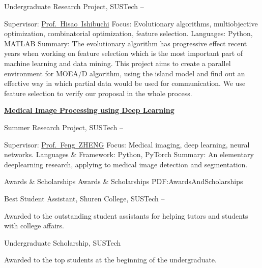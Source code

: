\documentclass[a4paper,MMMyyyy,nonstopmode]{simpleresumecv}
\begin{document}
\begin{Body}
\BulletItem
Undergraduate Research Project, SUSTech
\hfill
{} --
\begin{Detail}
\SubBulletItem
Supervisor:
\href{http://cse.sustech.edu.cn/faculty/~hisao/}{Prof.~Hisao~Ishibuchi}
\SubBulletItem
Focus:
Evolutionary algorithms, multiobjective optimization, combinatorial optimization, feature selection.
\SubBulletItem
Languages: Python, MATLAB
\SubBulletItem
Summary:
The evolutionary algorithm has progressive effect recent years when working on feature selection which is the most important part of machine learning and data mining. This project aims to create a parallel environment for MOEA/D algorithm, using the island model and find out an effective way in which partial data would be used for communication. We use feature selection to verify our proposal in the whole process.
\end{Detail}

\Gap
\Entry
\href{https://github.com/hackroid/cv-xmp}
{\textbf{Medical Image Processing using Deep Learning}}

\BulletItem
Summer Research Project, SUSTech
\hfill
{} --
\begin{Detail}
\SubBulletItem
Supervisor:
\href{https://faculty.sustech.edu.cn/fengzheng/en/}{Prof.~Feng~ZHENG}
\SubBulletItem
Focus:
Medical imaging, deep learning, neural networks.
\SubBulletItem
Languages \& Framework: Python, PyTorch
\SubBulletItem
Summary:
An elementary deeplearning research, applying to medical image detection and segmentation.
\end{Detail}



\Section
{Awards \&\newline
Scholarships}
{Awards \& Scholarships}
{PDF:AwardsAndScholarships}

\BulletItem
Best Student Assistant,
Shuren College,
SUSTech
\hfill
{} --
\begin{Detail}
\Item
Awarded to the outstanding student assistants for helping tutors and students with college affairs.
\end{Detail}

\Gap
\BulletItem
Undergraduate Scholarship,
SUSTech
\hfill
{}
\begin{Detail}
\Item
Awarded to the top students at the beginning of the undergraduate.
\end{Detail}



\end{Body}
\end{document}
